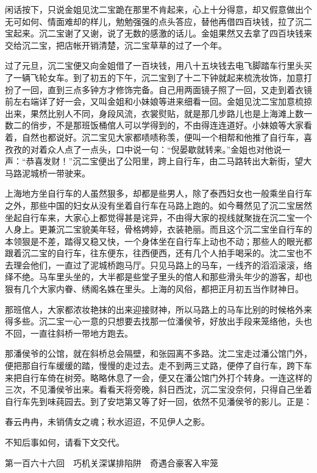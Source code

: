 \documentclass[12pt,UTF8]{ctexbook}
\begin{document}
{{{闲话按下，只说金姐见沈二宝跪在那里不肯起来，心上十分得意，却又假意做出个无可如何、情面难却的样儿，勉勉强强的点头答应，替他再借四百块钱，拉了沉二宝起来。沉二宝谢了又谢，说了无数的感激的话儿。金姐果然又去拿了四百块钱来交给沉二宝，把店帐开销清楚，沉二宝草草的过了一个年。

过了元旦，沉二宝便又向金姐借了一百块钱，用八十五块钱去电飞脚踏车行里头买了一辆飞轮女车。到了初五的下午，沉二宝到了十二下钟就起来梳洗妆饰，加意打扮了一回，直到三点多钟方才修饰完备。自己用两面镜子照了一回，又走到着衣镜前左右端详了好一会，又叫金姐和小妹娘等进来细看一回。金姐见沈二宝加意梳掠出来，果然比别人不同，身段风流，衣裳熨贴，就是那几步路儿也是上海滩上数一数二的俏步，不是那班饭桶倌人可以学得到的，不由得连连道好。小妹娘等大家看着，自然也都说好。沉二宝见大家都啧啧称羡，便叫一个相帮和他推了自行车，喜孜孜的对着众人点了一点头，口中说一句：“倪晏歇就转来。”金姐也对他说一声：“恭喜发财！”沉二宝便出了公阳里，跨上自行车，由二马路转出大新街，望大马路泥城桥一带驶来。

上海地方坐自行车的人虽然狠多，却都是些男人，除了泰西妇女也一般乘坐自行车之外，那些中国的妇女从没有坐着自行车在马路上跑的。如今蓦然见了沉二宝居然坐起自行车来，大家心上都觉得甚是诧异，不由得大家的视线就聚拢在沉二宝一个人身上。更兼沉二宝貌美年轻，骨格娉婷，衣装艳丽。而且这个沉二宝坐自行车的本领狠是不差，踏得又稳又快，一个身体坐在自行车上动也不动；那些人的眼光都跟着沉二宝的自行车，往东便东，往西便西，还有几个人拍手喝采的。沈二宝也不去理会他们，一直过了泥城桥跑马厅。只见马路上的马车，一线齐的滔滔滚滚，络绎不绝。马车里头坐的，大半都是些堂子里头的倌人和那些滑头年少的游客，却也狠有几个大家内眷、绣阁名姝在里头。上海的风俗，都把正月初五当作财神日。

那班倌人，大家都浓妆艳抹的出来迎接财神，所以马路上的马车比别的时候格外来得多些。沉二宝一心一意的只想要去找那一位潘侯爷，好放出手段来笼络他，头也不回，一直往斜桥一带地方跑去。

那潘侯爷的公馆，就在斜桥总会隔壁，和张园离不多路。沈二宝走过潘公馆门外，便把那自行车缓缓的踏，慢慢的走过去。走不到两三丈路，便停了自行车，跨下车来把自行车倚在树旁。略略休息了一会，便又在潘公馆门外打个转身。一连这样的三次，不见潘侯爷出来。看看天将旁晚，斜日西沈，沉二宝没奈何，只得自己坐着自行车先到味莼园去。到了安垲第又等了好一回，依然不见潘侯爷的影儿。正是：

春云冉冉，未销倩女之魂；秋水迢迢，不见伊人之影。

不知后事如何，请看下文交代。





第一百六十六回　巧机关深谋排陷阱　奇遇合豪客入牢笼





}}}
\end{document}
